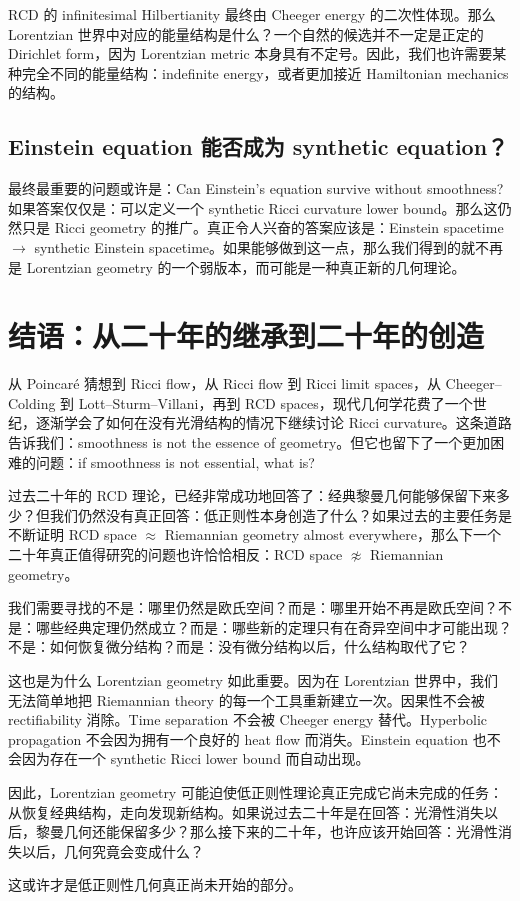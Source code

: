 \documentclass[lualatex]{article}
\begin{document}
RCD 的 infinitesimal Hilbertianity 最终由 Cheeger energy 的二次性体现。那么 Lorentzian 世界中对应的能量结构是什么？一个自然的候选并不一定是正定的 Dirichlet form，因为 Lorentzian metric 本身具有不定号。因此，我们也许需要某种完全不同的能量结构：indefinite energy，或者更加接近 Hamiltonian mechanics 的结构。

\subsection{Einstein equation 能否成为 synthetic equation？}

最终最重要的问题或许是：Can Einstein's equation survive without smoothness? 如果答案仅仅是：可以定义一个 synthetic Ricci curvature lower bound。那么这仍然只是 Ricci geometry 的推广。真正令人兴奋的答案应该是：Einstein spacetime $\longrightarrow$ synthetic Einstein spacetime。如果能够做到这一点，那么我们得到的就不再是 Lorentzian geometry 的一个弱版本，而可能是一种真正新的几何理论。

\section{结语：从二十年的继承到二十年的创造}

从 Poincar\'e 猜想到 Ricci flow，从 Ricci flow 到 Ricci limit spaces，从 Cheeger--Colding 到 Lott--Sturm--Villani，再到 RCD spaces，现代几何学花费了一个世纪，逐渐学会了如何在没有光滑结构的情况下继续讨论 Ricci curvature。这条道路告诉我们：smoothness is not the essence of geometry。但它也留下了一个更加困难的问题：if smoothness is not essential, what is?

过去二十年的 RCD 理论，已经非常成功地回答了：经典黎曼几何能够保留下来多少？但我们仍然没有真正回答：低正则性本身创造了什么？如果过去的主要任务是不断证明 RCD space $\approx$ Riemannian geometry almost everywhere，那么下一个二十年真正值得研究的问题也许恰恰相反：RCD space $\not\approx$ Riemannian geometry。

我们需要寻找的不是：哪里仍然是欧氏空间？而是：哪里开始不再是欧氏空间？不是：哪些经典定理仍然成立？而是：哪些新的定理只有在奇异空间中才可能出现？不是：如何恢复微分结构？而是：没有微分结构以后，什么结构取代了它？

这也是为什么 Lorentzian geometry 如此重要。因为在 Lorentzian 世界中，我们无法简单地把 Riemannian theory 的每一个工具重新建立一次。因果性不会被 rectifiability 消除。Time separation 不会被 Cheeger energy 替代。Hyperbolic propagation 不会因为拥有一个良好的 heat flow 而消失。Einstein equation 也不会因为存在一个 synthetic Ricci lower bound 而自动出现。

因此，Lorentzian geometry 可能迫使低正则性理论真正完成它尚未完成的任务：从恢复经典结构，走向发现新结构。如果说过去二十年是在回答：光滑性消失以后，黎曼几何还能保留多少？那么接下来的二十年，也许应该开始回答：光滑性消失以后，几何究竟会变成什么？

这或许才是低正则性几何真正尚未开始的部分。
\end{document}
